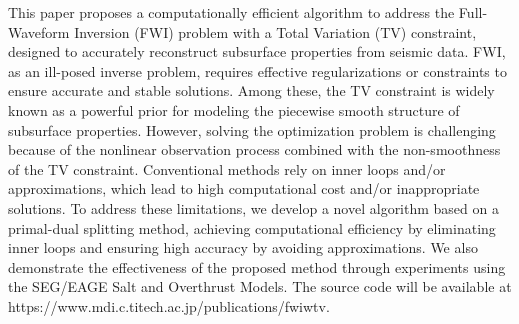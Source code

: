 This paper proposes a computationally efficient algorithm to address the Full-Waveform Inversion (FWI) problem with a Total Variation (TV) constraint, designed to accurately reconstruct subsurface properties from seismic data.
FWI, as an ill-posed inverse problem, requires effective regularizations or constraints to ensure accurate and stable solutions.
Among these, the TV constraint is widely known as a powerful prior for modeling the piecewise smooth structure of subsurface properties.
However, solving the optimization problem is challenging because of the nonlinear observation process combined with the non-smoothness of the TV constraint.
Conventional methods rely on inner loops and/or approximations, which lead to high computational cost and/or inappropriate solutions.
To address these limitations, we develop a novel algorithm based on a primal-dual splitting method, achieving computational efficiency by eliminating inner loops and ensuring high accuracy by avoiding approximations.
We also demonstrate the effectiveness of the proposed method through experiments using the SEG/EAGE Salt and Overthrust Models.
The source code will be available at https://www.mdi.c.titech.ac.jp/publications/fwiwtv.